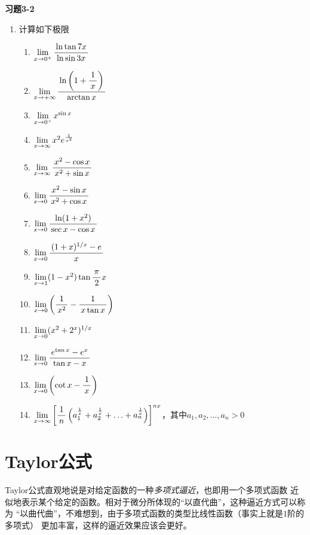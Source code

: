 \begin{ext}
	{\bf 习题3-2}
	
	\begin{enumerate}
	  \item 计算如下极限
		\begin{enumerate}[(1)]
		  \item $\lim\limits_{x\to{0^+}}\displaystyle\frac{\,{\ln\tan 7x}\,}{\,{\ln\sin 3x}\,}$
		  \item $\lim\limits_{x\to{+\infty}}\displaystyle\frac{\,{\ln\left(1+\displaystyle\frac{\,{1}\,}{\,{x}\,}\right)}\,}{\,{\arctan x}\,}$
		  \item $\lim\limits_{x\to{0^+}}x^{\sin x}$
		  \item $\lim\limits_{x\to{\infty}}x^2e^{\frac1{x^2}}$
		  \item $\lim\limits_{x\to{\infty}}\displaystyle\frac{\,{x^2-\cos x}\,}{\,{x^2+\sin x}\,}$
		  \item $\lim\limits_{x\to{0}}\displaystyle\frac{\,{x^2-\sin x}\,}{\,{x^2+\cos x}\,}$
		  \item $\lim\limits_{x\to{0}}\displaystyle\frac{\,{\ln(1+x^2)}\,}{\,{\sec x-\cos x}\,}$
  		  \item $\lim\limits_{x\to{0}}\displaystyle\frac{\,{(1+x)^{1/x}-e}\,}{\,{x}\,}$ 
   		  \item $\lim\limits_{x\to{1}}(1-x^2)\tan\displaystyle\frac{\,{\pi}\,}{\,{2}\,}x$ 
  		  \item $\lim\limits_{x\to{0}}\left(\displaystyle\frac{\,{1}\,}{\,{x^2}\,}-\displaystyle\frac{\,{1}\,}{\,{x\tan x}\,}\right)$ 
  		  \item $\lim\limits_{x\to{0}}(x^2+2^x)^{1/x}$ 
  		  \item $\lim\limits_{x\to{0}}\displaystyle\frac{\,{e^{\tan x}-e^x}\,}{\,{\tan x-x}\,}$
  		  \item $\lim\limits_{x\to{0}}\left(\cot x-\displaystyle\frac{\,{1}\,}{\,{x}\,}\right)$ 
  		  \item $\lim\limits_{x\to{\infty}}\left[\displaystyle\frac{\,{1}\,}{\,{n}\,}\left(a_1^{\frac1x}+a_2^{\frac1x}
  		  +\ldots+a_n^{\frac1x}\right)\right]^{nx}$，其中$a_1,a_2,\ldots,a_n>0$
		\end{enumerate}
	\end{enumerate}
\end{ext}

\section{Taylor公式}

Taylor公式直观地说是对给定函数的一种{\it 多项式逼近}，也即用一个多项式函数
近似地表示某个给定的函数。相对于微分所体现的“以直代曲”，这种逼近方式可以称为
“以曲代曲”，不难想到，由于多项式函数的类型比线性函数（事实上就是$1$阶的多项式）
更加丰富，这样的逼近效果应该会更好。

